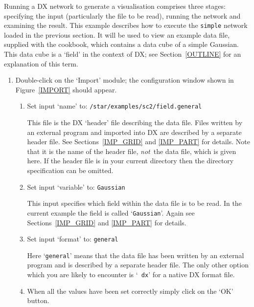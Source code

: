 Running a DX network to generate a visualisation comprises three stages:
specifying the input (particularly the file to be read), running the
network and examining the result. This example describes how to execute
the {\tt simple} network loaded in the previous section. It will be used
to view an example data file, supplied with the cookbook, which contains
a data cube of a simple Gaussian. This data cube is a `field' in the
context of DX; see Section~\ref{OUTLINE} for an explanation of this
term.

\begin{enumerate}

  \item Double-click on the `Import' module; the configuration window
   shown in Figure~\ref{IMPORT} should appear.

  \begin{enumerate}

    \item Set input `name' to: {\tt /star/examples/sc2/field.general}

     This file is the DX `header' file describing the data file.
     Files written by an external program and imported into DX are
     described by a separate header file. See Sections~\ref{IMP_GRID}
     and \ref{IMP_PART} for details. Note that it is the name of the
     header file, {\it not}\, the data file, which is given here. If
     the header file is in your current directory then the directory
     specification can be omitted.

    \item Set input `variable' to: {\tt Gaussian}

     This input specifies which field within the data file is to be
     read. In the current example the field is called `{\tt Gaussian}'.
     Again see Sections~\ref{IMP_GRID} and \ref{IMP_PART} for details. 

    \item Set input `format' to: {\tt general}

     Here `{\tt general}' means that the data file has been written by
     an external program and is described by a separate header file.
     The only other option which you are likely to encounter is `{\tt
     dx}' for a native DX format file.

    \item When all the values have been set correctly simply click on
     the `OK' button.

  \end{enumerate}


\end{enumerate}
